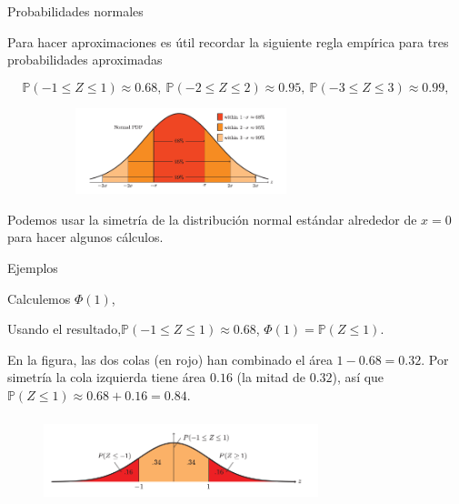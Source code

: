 \documentclass[10pt]{beamer}
\begin{document}
\begin{frame}{Probabilidades normales}
\small{
Para hacer aproximaciones es \'util recordar la siguiente regla emp\'irica para tres probabilidades aproximadas

\[
\mathbb{P}(-1 \leq Z \leq 1) \approx 0.68, \ \mathbb{P}(-2 \leq Z \leq 2) \approx 0.95,\ \mathbb{P}(-3 \leq Z \leq 3) \approx 0.99,
\]

\begin{figure}[ht]
	\centering
	\includegraphics[height=2.5cm, width=8cm]{R4.png}
\end{figure}


Podemos usar la simetr\'ia de la distribuci\'on normal est\'andar alrededor de $x = 0$ para hacer algunos c\'alculos.
}
\end{frame}


\begin{frame}{Ejemplos}
\small{ Calculemos $\Phi(1)$,

\vspace{0.3cm}

	
Usando el resultado,$\mathbb{P}(-1 \leq Z \leq 1) \approx 0.68$,  $\Phi(1) = \mathbb{P}(Z \leq 1)$. 

En la figura, las dos colas (en rojo) han combinado el \'area $1 -0.68 = 0.32$. Por simetr\'ia la cola izquierda tiene \'area $0.16$ (la mitad de $0.32$), as\'i que $\mathbb{P}(Z \leq  1) \approx 0.68 + 0.16 = 0.84$.


\begin{figure}[ht]
	\centering
	\includegraphics[height=2.5cm, width=8cm]{R5.png}
\end{figure}
}

\vspace{1.2cm}



\end{frame}
\end{document}

